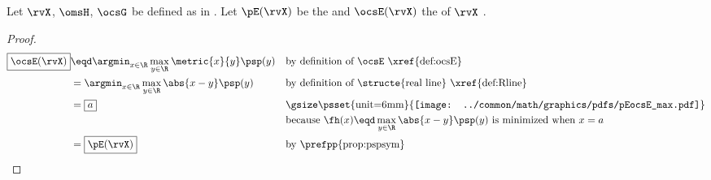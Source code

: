 \begin{theorem}
\label{thm:pEocsE}
Let $\rvX$, $\omsH$, $\ocsG$ be defined as in .
Let $\pE(\rvX)$ be the  
and $\ocsE(\rvX)$ the  of $\rvX$ .
\end{theorem}
\begin{proof}
\begin{align*}
  \boxed{\ocsE(\rvX)}
    &\eqd \argmin_{x\in\R}\max_{y\in\R}\metric{x}{y}\psp(y)
    && \text{by definition of $\ocsE$ \xref{def:ocsE}}
  \\&= \argmin_{x\in\R}\max_{y\in\R}\abs{x-y}\psp(y)
    && \text{by definition of \structe{real line} \xref{def:Rline}}
  \\&= \boxed{a}
    && \text{\gsize\centering\psset{unit=6mm}{\texttt{[image: ../common/math/graphics/pdfs/pEocsE\_max.pdf]}}}
  \\&&&\text{because $\fh(x)\eqd\max_{y\in\R}\abs{x-y}\psp(y)$ is minimized when $x=a$}%
  \\&= \boxed{\pE(\rvX)}
    && \text{by \prefpp{prop:pspsym}}
\end{align*}
\end{proof}

